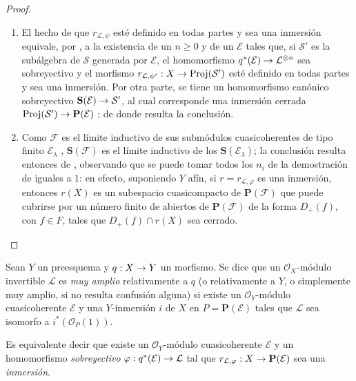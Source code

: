 \documentclass[oneside,10pt]{amsart}
\makeatletter
\renewcommand{\geq}{\geqslant}
\newcommand{\ega@arrow}[2]{\mathchoice{#1}{#2}{#2}{#2}}
\renewcommand{\to}{\ega@arrow{\longrightarrow}{\rightarrow}}
\let\EGAOriginalLabel\label
\renewcommand{\label}[1]{\phantomsection\EGAOriginalLabel{#1}}
\makeatother
\begin{document}
\begin{proof}
\medskip\noindent
\begin{enumerate}
  \item[\rm{(i)}] El hecho de que $r_{\mathcal{L},\psi}$ esté definido en todas partes y sea una inmersión equivale, por , a la existencia de un $n\geq0$ y de un $\mathcal{E}$ tales que, si $\mathcal{S}'$ es la subálgebra de $\mathcal{S}$ generada por $\mathcal{E}$, el homomorfismo $q^*(\mathcal{E})\to\mathcal{L}^{\otimes n}$ sea sobreyectivo y el morfismo $r_{\mathcal{L},\psi'}:X\to\operatorname{Proj}(\mathcal{S}')$ esté definido en todas partes y sea una inmersión.
    Por otra parte, se tiene un homomorfismo canónico sobreyectivo $\mathbf{S}(\mathcal{E})\to\mathcal{S}'$, al cual corresponde una inmersión cerrada $\operatorname{Proj}(\mathcal{S}')\to\mathbf{P}(\mathcal{E})$ ;
    de donde resulta la conclusión.
  \item[\rm{(ii)}] Como $\mathcal{F}$ es el límite inductivo de sus submódulos cuasicoherentes de tipo finito $\mathcal{E}_\lambda$ , $\mathbf{S}(\mathcal{F})$ es el límite inductivo de los $\mathbf{S}(\mathcal{E}_\lambda)$;
    la conclusión resulta entonces de , observando que se puede tomar todos los $n_i$ de la demostración de  iguales a $1$:
    en efecto, suponiendo $Y$ afín, si $r=r_{\mathcal{L},\varphi}$ es una inmersión, entonces $r(X)$ es un subespacio cuasicompacto de $\mathbf{P}(\mathcal{F})$ que puede cubrirse por un número finito de abiertos de $\mathbf{P}(\mathcal{F})$ de la forma $D_+(f)$, con $f\in F$, tales que $D_+(f)\cap r(X)$ sea cerrado.
\end{enumerate}
\end{proof}

\begin{definition}[4.4.2]
\label{II.4.4.2-fr}
Sean $Y$ un preesquema y $q:X\to Y$ un morfismo.
Se dice que un $\mathcal{O}_X$-módulo invertible $\mathcal{L}$ es \emph{muy amplio} relativamente a $q$ \textup{(o} relativamente a $Y$\textup{, o simplemente} muy amplio\textup{, si no resulta confusión alguna)} si existe un $\mathcal{O}_Y$-módulo cuasicoherente $\mathcal{E}$ y una $Y$-inmersión $i$ de $X$ en $P=\mathbf{P}(\mathcal{E})$ tales que $\mathcal{L}$ sea isomorfo a $i^*(\mathcal{O}_P(1))$.
\end{definition}

Es equivalente  decir que existe un $\mathcal{O}_Y$-módulo cuasicoherente $\mathcal{E}$ y un homomorfismo \emph{sobreyectivo} $\varphi:q^*(\mathcal{E})\to\mathcal{L}$ tal que $r_{\mathcal{L},\varphi}:X\to\mathbf{P}(\mathcal{E})$ sea una \emph{inmersión}.
\end{document}
